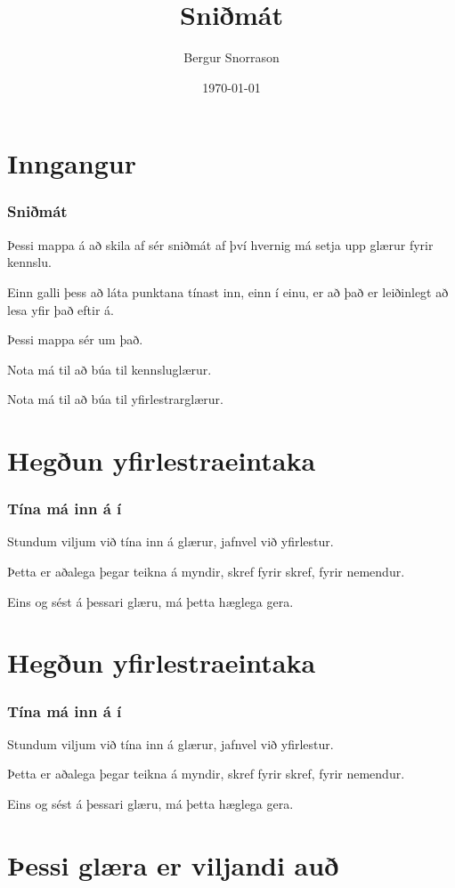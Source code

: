 \title{Sniðmát}
\author{Bergur Snorrason}
\date{\today}



\frame{\titlepage}

\section{Inngangur}
{
    \frametitle{Sniðmát}
    {
        \item<1-> Þessi mappa á að skila af sér sniðmát af því hvernig má setja upp glærur fyrir kennslu.
        \item<2-> Einn galli þess að láta punktana tínast inn, einn í einu, er að það er leiðinlegt að lesa yfir það eftir á.
        \item<3-> Þessi mappa sér um það.
        \item<4-> Nota má  til að búa til kennsluglærur.
        \item<5-> Nota má  til að búa til yfirlestrarglærur.
    }
}

\section{Hegðun yfirlestraeintaka}
{
    \frametitle{Tína má inn á í }
    {
        \item<all:1-> Stundum viljum við tína inn á glærur, jafnvel við yfirlestur.
        \item<all:2-> Þetta er aðalega þegar teikna á myndir, skref fyrir skref, fyrir nemendur.
        \item<all:3-> Eins og sést á þessari glæru, má þetta hæglega gera.
    }
}

\section{Hegðun yfirlestraeintaka}
{
    \frametitle{Tína má inn á í }
    {
        \item<all:1-> Stundum viljum við tína inn á glærur, jafnvel við yfirlestur.
        \item<all:2-> Þetta er aðalega þegar teikna á myndir, skref fyrir skref, fyrir nemendur.
        \item<all:3-> Eins og sést á þessari glæru, má þetta hæglega gera.
    }
}

\section{Þessi glæra er viljandi auð}
{
}


